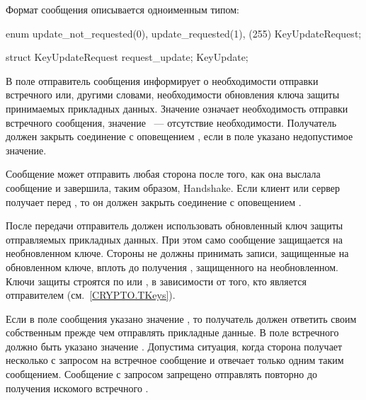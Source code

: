 Формат сообщения  описывается одноименным типом:
%
\begin{codeblock}
enum {
  update_not_requested(0), update_requested(1), (255)
} KeyUpdateRequest;

struct {
  KeyUpdateRequest request_update;
} KeyUpdate;
\end{codeblock}

В поле  отправитель сообщения информирует о 
необходимости отправки встречного  или, другими словами,
необходимости обновления ключа защиты принимаемых прикладных данных.
%
Значение  означает необходимость отправки встречного 
сообщения, значение ~--- отсутствие необходимости.
%
Получатель должен закрыть соединение с оповещением 
, если в поле указано недопустимое 
значение.

Сообщение  может отправить любая сторона после
того, как она выслала сообщение  и завершила,
таким образом, Handshake. 
%
Если клиент или сервер получает  перед 
, то он должен закрыть соединение с оповещением 
. 

После передачи  отправитель должен использовать обновленный ключ 
защиты отправляемых прикладных данных. 
%
При этом само сообщение  защищается на необновленном ключе.
%
Стороны не должны принимать записи, защищенные на обновленном ключе, вплоть до 
получения , защищенного на необновленном.
%
%
Ключи защиты строятся по  или 
, в зависимости от того, 
кто является отправителем (см.~\ref{CRYPTO.TKeys}).

Если в поле  сообщения  указано значение 
, то получатель должен ответить своим собственным
 прежде чем отправлять прикладные данные. 
%
В поле  встречного  должно быть указано 
значение .
%
Допустима ситуация, когда сторона получает несколько  с 
запросом на встречное сообщение и отвечает только одним таким сообщением.
%
Сообщение  с запросом запрещено отправлять повторно до 
получения искомого встречного .

